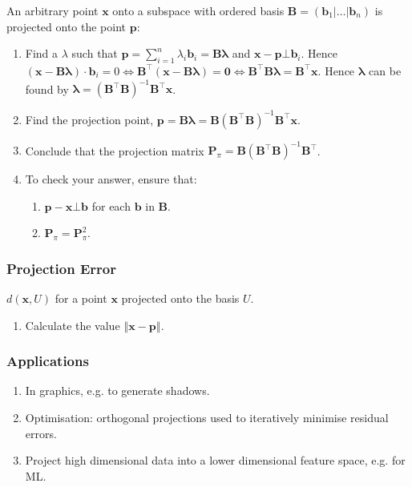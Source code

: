 \documentclass[10pt,twoside,twocolumn]{article}
\begin{document}
An arbitrary point $\mathbf{x}$ onto a subspace with ordered basis
$\mathbf{B}=\left(\mathbf{b}_{1}|\dots|\mathbf{b}_{n}\right)$ is
projected onto the point $\mathbf{p}$: 
\begin{enumerate}
\item Find a $\lambda$ such that $\mathbf{p}=\sum_{i=1}^{n}\lambda_{i}\mathbf{b}_{i}=\mathbf{B}\mathbf{\lambda}$
and $\mathbf{x}-\mathbf{p}\bot\mathbf{b}_{i}$. Hence $\left(\mathbf{x}-\mathbf{B}\mathbf{\lambda}\right)\cdot\mathbf{b}_{i}=0\iff\mathbf{B}^{\top}\left(\mathbf{x}-\mathbf{B}\mathbf{\mathbf{\lambda}}\right)=\boldsymbol{0}\iff\mathbf{B}^{\top}\mathbf{B}\mathbf{\mathbf{\lambda}}=\mathbf{B}^{\top}\mathbf{x}$.
Hence $\mathbf{\lambda}$ can be found by $\boxed{\mathbf{\mathbf{\lambda}}=\left(\mathbf{B}^{\top}\mathbf{B}\right)^{-1}\mathbf{B}^{\top}\mathbf{x}}$. 
\item Find the projection point, $\boxed{\mathbf{p}=\mathbf{B}\mathbf{\lambda}}=\mathbf{B}\left(\mathbf{B}^{\top}\mathbf{B}\right)^{-1}\mathbf{B}^{\top}\mathbf{x}$. 
\item Conclude that the projection matrix $\boxed{\mathbf{P}_{\pi}=\mathbf{B}\left(\mathbf{B}^{\top}\mathbf{B}\right)^{-1}\mathbf{B}^{\top}}$. 
\item To check your answer, ensure that:

\begin{enumerate}
\item \textbf{$\mathbf{p}-\mathbf{x}\bot\mathbf{b}$} for each $\mathbf{b}$
in $\mathbf{B}$. 
\item $\mathbf{P}_{\pi}=\mathbf{P}_{\pi}^{2}$. 
\end{enumerate}
\end{enumerate}

\subsubsection{Projection Error}

$d\left(\mathbf{x},U\right)$ for a point $\mathbf{x}$ projected
onto the basis $U$. 
\begin{enumerate}
\item Calculate the value $\left\Vert \mathbf{x}-\mathbf{p}\right\Vert $. 
\end{enumerate}

\subsubsection{Applications}
\begin{enumerate}
\item In graphics, e.g. to generate shadows.
\item Optimisation: orthogonal projections used to iteratively minimise
residual errors.
\item Project high dimensional data into a lower dimensional feature space,
e.g. for ML.
\end{enumerate}
\end{document}
